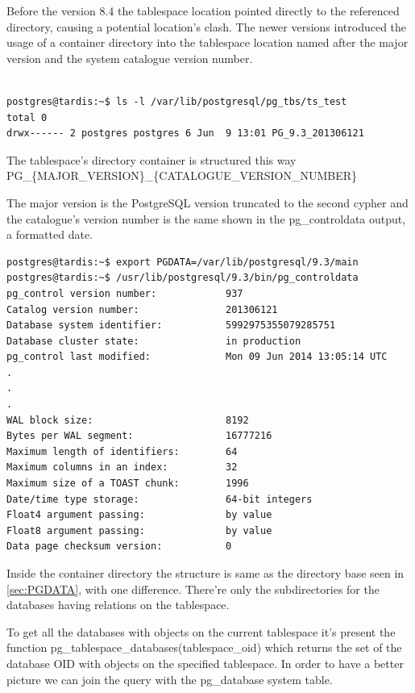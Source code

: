 Before the version 8.4 the tablespace location pointed directly to the referenced directory, 
causing 
a potential location's clash. The newer versions introduced the usage of a container directory into 
the tablespace location named after the major version and the system catalogue version number. 
\newline

\begin{verbatim}

postgres@tardis:~$ ls -l /var/lib/postgresql/pg_tbs/ts_test
total 0
drwx------ 2 postgres postgres 6 Jun  9 13:01 PG_9.3_201306121

\end{verbatim}

The tablespace's directory container is structured this way\newline
PG\_\{MAJOR\_VERSION\}\_\{CATALOGUE\_VERSION\_NUMBER\}\newline

The major version is the PostgreSQL version truncated to the second cypher and the catalogue's 
version number is the same shown in the pg\_controldata output, a formatted date.

\begin{verbatim}
postgres@tardis:~$ export PGDATA=/var/lib/postgresql/9.3/main
postgres@tardis:~$ /usr/lib/postgresql/9.3/bin/pg_controldata 
pg_control version number:            937
Catalog version number:               201306121
Database system identifier:           5992975355079285751
Database cluster state:               in production
pg_control last modified:             Mon 09 Jun 2014 13:05:14 UTC
.
.
.
WAL block size:                       8192
Bytes per WAL segment:                16777216
Maximum length of identifiers:        64
Maximum columns in an index:          32
Maximum size of a TOAST chunk:        1996
Date/time type storage:               64-bit integers
Float4 argument passing:              by value
Float8 argument passing:              by value
Data page checksum version:           0

\end{verbatim}

Inside the container directory the structure is same as the directory base seen in 
\ref{sec:PGDATA}, 
with one difference. There're only the subdirectories for the databases having relations on the 
tablespace.\newline

To get all the databases with objects on the current tablespace it's present the function 
pg\_tablespace\_databases(tablespace\_oid) which returns the set of the database OID with objects 
on 
the specified tablespace. In order to have a better picture we can join the query with the 
pg\_database system table.\newline

